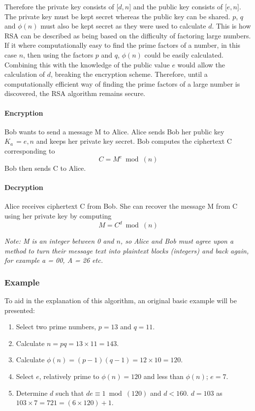 \documentclass[a4paper,12pt]{report}
\begin{document}
Therefore the private key consists of [$d,n$] and the public key consists of [$e,n$]. The private key must be kept secret whereas the public key can be shared. $p$, $q$ and $ \phi(n) $ must also be kept secret as they were used to calculate $d$. This is how RSA can be described as being based on the difficulty of factoring large numbers. If it where computationally easy to find the prime factors of a number, in this case $n$, then using the factors $p$ and $q$, $\phi(n)$ could be easily calculated. Combining this with the knowledge of the public value $e$ would allow the calculation of $d$, breaking the encryption scheme. Therefore, until a computationally efficient way of finding the prime factors of a large number is discovered, the RSA algorithm remains secure. 


\paragraph{Encryption}

Bob wants to send a message M to Alice. Alice sends Bob her public key $ K_{a} \, = {e,n} $ and keeps her private key secret. Bob computes the ciphertext C corresponding to
\[ C = M^{e} \bmod(n) \]
Bob then sends C to Alice.

\paragraph{Decryption}

Alice receives ciphertext C from Bob. She can recover the message M from C using her private key by computing
\[ M = C^{d} \bmod(n) \]

\textit{Note: M is an integer between 0 and $n$, so Alice and Bob must agree upon a method to turn their message text into plaintext blocks (integers) and back again, for example a = 00, A = 26 etc.}

\subsubsection{Example}

To aid in the explanation of this algorithm, an original basic example will be presented:

\begin{enumerate}
 \item Select two prime numbers, $p=13$ and $q=11$.
 \item Calculate $n=pq=13\times11=143$.
 \item Calculate $\phi(n)=(p-1)(q-1)=12\times10 = 120$.
 \item Select $e$, relatively prime to $\phi(n)=120$ and less than $\phi(n)$; $e=7$.
 \item Determine $d$ such that $de \equiv 1 \bmod(120)$ and $d < 160$. $d = 103$ as $103 \times 7 = 721 = (6 \times 120) + 1$.
\end{enumerate}
\end{document}
